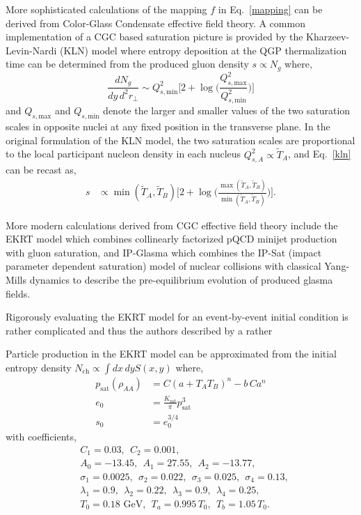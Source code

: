 \documentclass[aps,prc,reprint,amsmath,nofootinbib]{revtex4-1}
\newcommand{\nch}{N_\text{ch}}
\newcommand{\T}{\tilde{T}}
\newcommand{\Qs}[1]{Q_{s,\text{#1}}}
\begin{document}
More sophisticated calculations of the mapping $f$ in Eq.~\eqref{mapping} can be derived from Color-Glass Condensate effective field theory. A common implementation of a CGC based saturation picture is provided by the Kharzeev-Levin-Nardi (KLN) model where entropy deposition at the QGP thermalization time can be determined from the produced gluon density $s \propto N_g$ where,
\begin{equation}
    \label{kln}
    \frac{dN_g}{dy\,d^2r_\perp} \sim \Qs{min}^2 \biggl[ 2 + \log \biggr(\frac{\Qs{max}^2}{\Qs{min}^2} \biggr) \biggr]
\end{equation}
and $\Qs{max}$ and $\Qs{min}$ denote the larger and smaller values of the two saturation scales in opposite nuclei at any fixed position in the transverse plane.
In the original formulation of the KLN model, the two saturation scales are proportional to the local participant nucleon density in each nucleus $Q^2_{s,A} \propto \T_A$, and Eq.~\eqref{kln} can be recast as,
\begin{align}
    s &\propto \min(\T_A, \T_B)\biggr[2 + \log \biggr(\frac{\max(\T_A,\T_B)}{\min(\T_A,\T_B)}\biggr) \biggr].
\end{align}

More modern calculations derived from CGC effective field theory include the EKRT model which combines collinearly factorized pQCD minijet production with gluon saturation, and IP-Glasma which combines the IP-Sat (impact parameter dependent saturation) model of nuclear collisions with classical Yang-Mills dynamics to describe the pre-equilibrium evolution of produced glasma fields.

Rigorously evaluating the EKRT model for an event-by-event initial condition is rather complicated and thus the authors described by a rather 

Particle production in the EKRT model can be approximated from the initial entropy density ${\nch \propto \int dx\,dy S(x,y)}$ where,
\begin{align}
    p_\text{sat}(\rho_{AA}) &= C(a + T_A T_B)^n - b\,C a^n \\
    e_0 &= \frac{K_\text{sat}}{\pi} p_\text{sat}^3 \\
    s_0 &= e_0^{3/4} 
\end{align}
with coefficients,
\begin{align*}
    &C_1=0.03, ~~C_2=0.001, \\ 
    &A_0=-13.45, ~~A_1=27.55, ~~A_2=-13.77, \\
    &\sigma_1=0.0025, ~~\sigma_2=0.022, ~~\sigma_3=0.025, ~~\sigma_4=0.13, \\
    &\lambda_1=0.9, ~~\lambda_2=0.22, ~~\lambda_3=0.9, ~~\lambda_4=0.25, \\
    &T_0 = 0.18 \text{ GeV}, ~~T_a = 0.995\, T_0, ~~T_b = 1.05\, T_0.
\end{align*}
\end{document}
